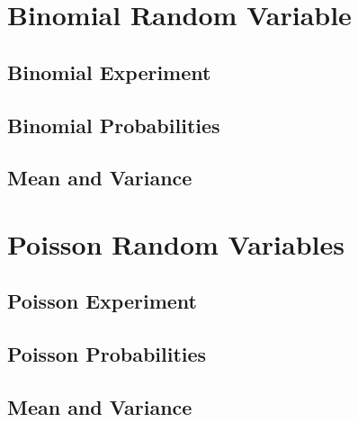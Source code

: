 \section{Binomial Random Variable}  %
\subsection{Binomial Experiment}  %
\subsection{Binomial Probabilities}  %
\subsection{Mean and Variance}  %

\section{Poisson Random Variables}  %
\subsection{Poisson Experiment}  %
\subsection{Poisson Probabilities}  %
\subsection{Mean and Variance}  %
